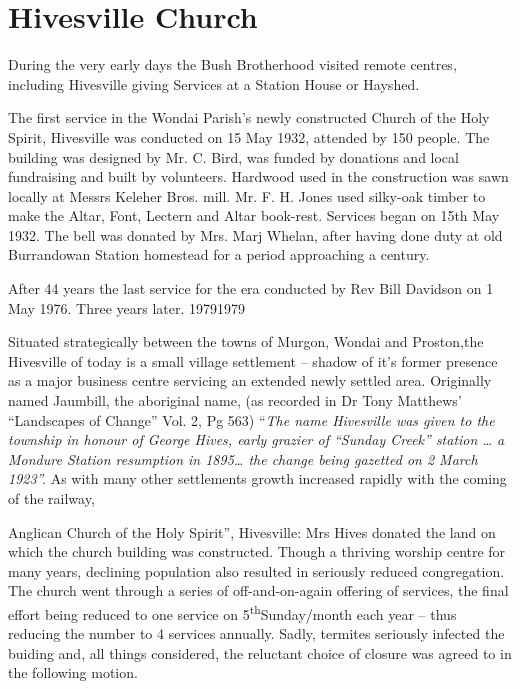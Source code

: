 \section{Hivesville Church}



During the very early days the Bush Brotherhood visited remote centres, including Hivesville giving Services at a Station House or Hayshed.



The first service in the Wondai Parish's newly constructed Church of the Holy Spirit, Hivesville was conducted on 15 May 1932, attended by 150 people. The building was designed by Mr. C. Bird, was funded by donations and local fundraising and built by volunteers. Hardwood used in the construction was sawn locally at Messrs Keleher Bros. mill. Mr. F. H. Jones used silky-oak timber to make the Altar, Font, Lectern and Altar book-rest. Services began on 15th May 1932. The bell was donated by Mrs. Marj Whelan, after having done duty at old Burrandowan Station homestead for a period approaching a century.



After 44 years the last service for the era conducted by Rev Bill Davidson on 1 May 1976. Three years later. 19791979



Situated strategically between the towns of Murgon, Wondai and Proston,the Hivesville of today is a small village settlement -- shadow of it's former presence as a major business centre servicing an extended newly settled area. Originally named Jaumbill, the aboriginal name, (as recorded in Dr Tony Matthews' ``Landscapes of Change'' Vol. 2, Pg 563) ``\emph{The name Hivesville was given to the township in honour of George Hives, early grazier of ``Sunday Creek'' station \ldots{} a Mondure Station resumption in 1895\ldots{} the change being gazetted on 2 March 1923''.} As with many other settlements growth increased rapidly with the coming of the railway,



Anglican Church of the Holy Spirit'', Hivesville: Mrs Hives donated the land on which the church building was constructed. Though a thriving worship centre for many years, declining population also resulted in seriously reduced congregation. The church went through a series of off-and-on-again offering of services, the final effort being reduced to one service on 5\textsuperscript{th}Sunday/month each year -- thus reducing the number to 4 services annually. Sadly, termites seriously infected the buiding and, all things considered, the reluctant choice of closure was agreed to in the following motion.



